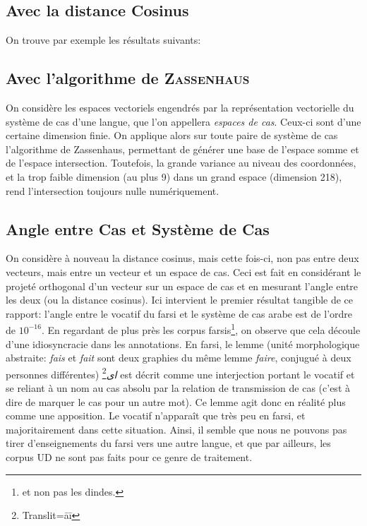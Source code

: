 \documentclass{cours}
\newcommand{\codedir}{Morphosyntactic-Categories_Code}
\begin{document}
    \subsection{Avec la distance Cosinus}
    On trouve par exemple les résultats suivants:

    

    

    

    

    

    

    

    \subsection{Avec l'algorithme de \textsc{Zassenhaus}}
    On considère les espaces vectoriels engendrés par la représentation vectorielle du système de cas d'une langue, que l'on appellera \textit{espaces de cas}.
    Ceux-ci sont d'une certaine dimension finie.
    On applique alors sur toute paire de système de cas l'algorithme de Zassenhaus, permettant de générer une base de l'espace somme et de l'espace intersection.
    Toutefois, la grande variance au niveau des coordonnées, et la trop faible dimension (au plus 9) dans un grand espace (dimension 218), rend l'intersection toujours nulle numériquement.

    \subsection{Angle entre Cas et Système de Cas}
    On considère à nouveau la distance cosinus, mais cette fois-ci, non pas entre deux vecteurs, mais entre un vecteur et un espace de cas.
    Ceci est fait en considérant le projeté orthogonal d'un vecteur sur un espace de cas et en mesurant l'angle entre les deux (ou la distance cosinus).
    Ici intervient le premier résultat tangible de ce rapport: l'angle entre le vocatif du farsi et le système de cas arabe est de l'ordre de $10^{-16}$.
    En regardant de plus près les corpus farsis\footnote{et non pas les dindes.}, on observe que cela découle d'une idiosyncracie dans les annotations.
    En farsi, le lemme (unité morphologique abstraite: \textsl{fais} et \textsl{fait} sont deux graphies du même lemme \textsl{faire}, conjugué à deux personnes différentes)
    \textit{ای}\footnote{Translit=āī} est décrit comme une interjection portant le vocatif et se reliant à un nom au cas absolu par la relation de transmission de cas (c'est à dire de marquer le cas pour un autre mot).
    Ce lemme agit donc en réalité plus comme une apposition.
    Le vocatif n'apparaît que très peu en farsi, et majoritairement dans cette situation.
    Ainsi, il semble que nous ne pouvons pas tirer d'enseignements du farsi vers une autre langue, et que par ailleurs, les corpus UD ne sont pas faits pour ce genre de traitement.
\end{document}
